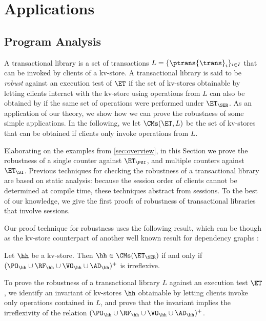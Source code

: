 \section{Applications}
\label{sec:applications}

\subsection{Program Analysis}
\label{sec:program-analysis}
A transactional library is a set of transactions 
$L = \{\ptrans{\trans}_{i}\}_{i \in I}$ that can be invoked 
by clients of a kv-store. A transactional library is said to be 
\emph{robust} against an execution test of $\ET$ if the set of kv-stores 
obtainable by letting clients interact with the kv-store using 
operations from $L$ can also be obtained by if the same 
set of operations were performed under $\ET_{\SER}$.
As an application of our theory, we show how we 
can prove the robustness of some simple applications. 
In the following, we let $\CMs(\ET, L)$ be 
the set of kv-stores that can be obtained if clients 
only invoke operations from $L$.

Elaborating on the examples from \cref{sec:overview}, in this Section 
we prove the robustness of a single counter against $\ET_{\PSI}$, 
and multiple counters against $\ET_{\SI}$. Previous techniques for 
checking the robustness of a transactional library \cite{giovanni_concur16,SIanalysis,laws,sureshConcur} 
are based on static analysis: because the session order of clients cannot be determined at compile 
time, these techniques abstract from sessions. To the best of our knowledge, 
we give the first proofs of robustness of transactional libraries that involve sessions.

Our proof technique for robustness uses the following result, which can be though 
as the kv-store counterpart of another well known result for dependency graphs \cite{adya}:
\begin{theorem}
\label{thm:serialisable_nocycle}
Let $\hh$ be a kv-store. Then $\hh \in \CMs(\ET_{\SER})$ if and only if $(\PO_{\hh} \cup \RF_{\hh} 
\cup \VO_{\hh} \cup \AD_{\hh})^{+}$ is irreflexive.
\end{theorem}
To prove the robustness of a transactional library $L$ against an execution test 
$\ET$, we identify an invariant of kv-stores $\hh$ obtainable by letting clients 
invoke only operations contained in $L$, and prove that the invariant 
implies the irreflexivity of the relation $(\PO_{\hh} \cup \RF_{\hh} \cup \VO_{\hh} \cup 
\AD_{\hh})^{+}$.

